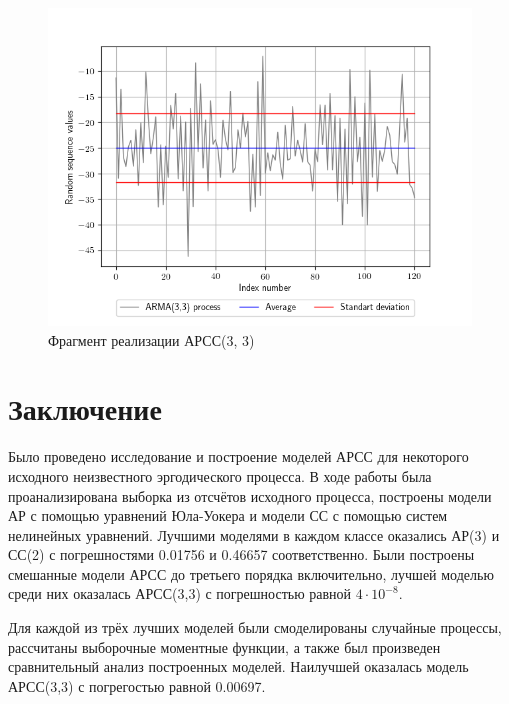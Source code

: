 \documentclass[12pt, fleqn]{article}
\begin{document}
{	\begin{figure}[H]
		\includegraphics{plot_arma_modeled.png}
		\caption{Фрагмент реализации АРСС(3, 3)}
	\end{figure}
}
			
\newpage
{}
{}
\section*{Заключение}
{
	   	Было проведено исследование и построение моделей АРСС для некоторого исходного неизвестного эргодического процесса. В ходе работы была проанализирована выборка из отсчётов исходного процесса, построены модели АР с помощью уравнений Юла-Уокера и модели СС с помощью систем нелинейных уравнений. Лучшими моделями в каждом классе оказались АР(3) и СС(2) с погрешностями 0.01756 и 0.46657 соответственно. Были построены смешанные модели АРСС до третьего порядка включительно, лучшей моделью среди них оказалась АРСС(3,3) с погрешностью равной $4\cdot10^{-8}$.
	  	
	  	Для каждой из трёх лучших моделей были смоделированы случайные процессы, рассчитаны выборочные моментные функции, а также был произведен сравнительный анализ построенных моделей. Наилучшей оказалась модель АРСС(3,3) с погрегостью равной  0.00697. 
}
			
\newpage
{}
{}
\end{document}
